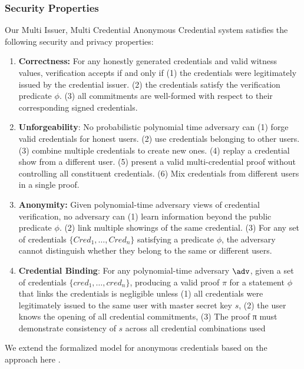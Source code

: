 \subsubsection{Security Properties}
Our Multi Issuer, Multi Credential Anonymous Credential system satisfies the following security and privacy properties:
\begin{enumerate}
    \item \textbf{Correctness: } For any honestly generated credentials and valid witness values, verification accepts if and only if (1) the credentials were legitimately issued by the credential issuer. (2) the credentials satisfy the verification predicate $\phi$. (3) all commitments are well-formed with respect to their corresponding signed credentials. 
    
    \item \textbf{Unforgeability}: No probabilistic polynomial time adversary can (1) forge valid credentials for honest users. (2) use credentials belonging to other users. (3) combine multiple credentials to create new ones. (4) replay a credential show from a different user. (5) present a valid multi-credential proof without controlling all constituent credentials. (6) Mix credentials from different users in a single proof.
    
    \item \textbf{Anonymity:} Given polynomial-time adversary views of credential verification, no adversary can (1) learn information beyond the public predicate $\phi$. (2) link multiple showings of the same credential. (3) For any set of credentials $\{Cred_1,\dots,Cred_n\}$ satisfying a predicate $\phi$, the adversary cannot distinguish whether they belong to the same or different users.

    \item \textbf{Credential Binding}: For any polynomial-time adversary $\adv$, given a set of credentials $\{cred_1, \dots, cred_n\}$, producing a valid proof $\pi$ for a statement $\phi$ that links the credentials is negligible unless (1) all credentials were legitimately issued to the same user with master secret key $s$, (2) the user knows the opening of all credential commitments, (3) The proof π must demonstrate consistency of $s$ across all credential combinations used

\end{enumerate}

We extend the formalized model for anonymous credentials based on the approach here \cite{fuchsbauer_structure-preserving_2019}. 


